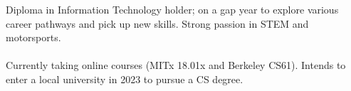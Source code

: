 

\begin{cvparagraph}

Diploma in Information Technology holder; on a gap year to explore various career pathways and pick up new skills. Strong passion in STEM and motorsports. \\\\Currently taking online courses (MITx 18.01x and Berkeley CS61).
Intends to enter a local university in 2023 to pursue a CS degree. 
\end{cvparagraph}
